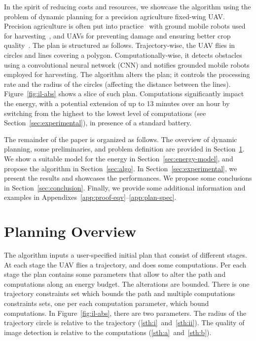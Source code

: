 \documentclass[letterpaper,10pt,conference]{ieeeconf}
\theoremstyle{definition}
\begin{document}
In the spirit of reducing costs and resources, we showcase the algorithm using the problem of dynamic planning for a precision agriculture fixed-wing UAV. Precision agriculture is often put into practice~\cite{hajjaj2014review} with ground mobile robots used for harvesting~\cite{qingchun2012study,dong2011development, de2011design, aljanobi2010setup, li2008analysis, edan2000robotic}, and UAVs for preventing damage and ensuring better crop quality~\cite{puri2017agriculture, daponte2019review}. The plan is structured as follows. Trajectory-wise, the UAV flies in circles and lines covering a polygon. Computationally-wise, it detects obstacles using a convolutional neural network (CNN) and notifies grounded mobile robots employed for harvesting. The algorithm alters the plan; it controls the processing rate and the radius of the circles (affecting the distance between the lines). Figure~\ref{fig:il-abs} shows a slice of such plan. Computations significantly impact the energy, with a potential extension of up to 13 minutes over an hour by switching from the highest to the lowest level of computations (see Section~\ref{sec:experimental}), in presence of a standard battery.

The remainder of the paper is organized as follows. The overview of dynamic planning, some preliminaries, and problem definition are provided in Section~\ref{sec:prob}. We show a suitable model for the energy in Section~\ref{sec:energy-model}, and propose the algorithm in Section~\ref{sec:algo}. In Section~\ref{sec:experimental}, we present the results and showcases the performances. We propose some conclusions in Section~\ref{sec:conclusion}. Finally, we provide some additional information and examples in Appendixes~\ref{app:proof-eqv}--\ref{app:plan-spec}.


\section{Planning Overview}
\label{sec:prob}
 
The algorithm inputs a user-specified initial plan that consist of different stages. At each stage the UAV flies a trajectory, and does some computations. Per each stage the plan contains some parameters that allow to alter the path and computations along an energy budget. The alterations are bounded. There is one trajectory constraints set which bounds the path and multiple computations constraints sets, one per each computation parameter, which bound computations. In Figure~\ref{fig:il-abs}, there are two parameters. The radius of the trajectory circle is relative to the trajectory (\ref{sth:i}~and~\ref{sth:ii}). The quality of image detection is relative to the computations (\ref{sth:a}~and~\ref{sth:b}). 
\end{document}
